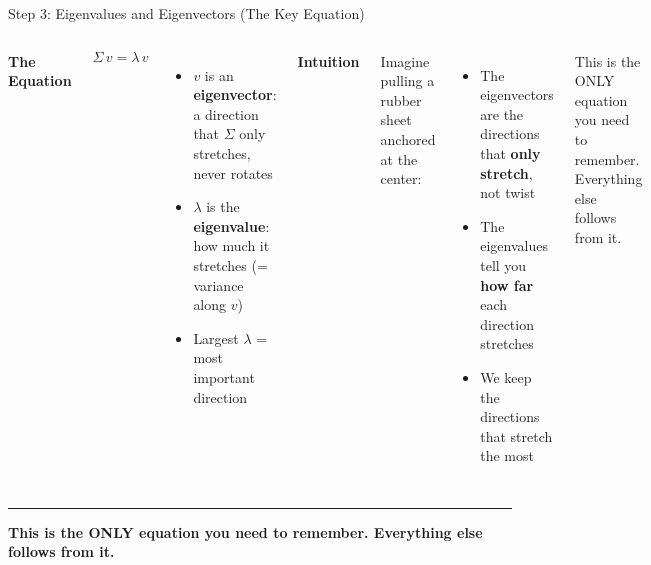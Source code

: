 \documentclass[8pt,aspectratio=169]{beamer}
\newcommand{\bottomnote}[1]{%
\vfill
\vspace{-2mm}
\textcolor{mllavender2}{\rule{\textwidth}{0.4pt}}
\vspace{1mm}
\footnotesize
\textbf{#1}
}
\newenvironment{compactlist}{%
  \begin{itemize}%
    \setlength{\itemsep}{2pt}%
    \setlength{\parskip}{0pt}%
    \setlength{\parsep}{0pt}%
}{%
  \end{itemize}%
}
\newcommand{\highlight}[1]{\textcolor{mlorange}{\textbf{#1}}}
\begin{document}
\begin{frame}[t]{Step 3: Eigenvalues and Eigenvectors (The Key Equation)}
\begin{columns}[T]
\small
\textbf{The Equation}

\vspace{2mm}
$$\Sigma \, v = \lambda \, v$$

\vspace{2mm}
\begin{compactlist}
\item $v$ is an \highlight{eigenvector}: a direction that $\Sigma$ only stretches, never rotates
\item $\lambda$ is the \highlight{eigenvalue}: how much it stretches (= variance along $v$)
\item Largest $\lambda$ = most important direction
\end{compactlist}

\small
\textbf{Intuition}

\vspace{2mm}
Imagine pulling a rubber sheet anchored at the center:

\vspace{2mm}
\begin{compactlist}
\item The eigenvectors are the directions that \highlight{only stretch}, not twist
\item The eigenvalues tell you \highlight{how far} each direction stretches
\item We keep the directions that stretch the most
\end{compactlist}

\vspace{2mm}
\begin{block}{}
\scriptsize This is the ONLY equation you need to remember. Everything else follows from it.
\end{block}
\end{columns}

\bottomnote{This is the ONLY equation you need to remember. Everything else follows from it.}
\end{frame}
\end{document}
